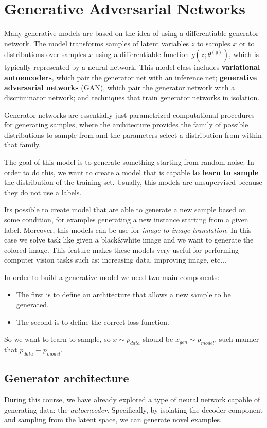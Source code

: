 \chapter{Generative Adversarial Networks}
Many generative models are based on the idea of using a differentiable generator network. The model 
transforms samples of latent variables $z$ to samples $x$ or to distributions over samples $x$ using a 
differentiable function $g(z; \theta^{(g)})$, which is typically represented by a neural network. This 
model class includes \textbf{variational autoencoders}, which pair the generator net with an inference 
net; \textbf{generative adversarial networks} (GAN), which pair the generator network with a discriminator 
network; and techniques that train generator networks in isolation.

Generator networks are essentially just parametrized computational procedures for generating samples, 
where the architecture provides the family of possible distributions to sample from and the parameters 
select a distribution from within that family.

The goal of this model is to generate something starting from random noise. In order to do this, we want 
to create a model that is capable \textbf{to learn to sample} the distribution of the training set. 
Usually, this models are unsupervised because they do not use a labels. 

Its possible to create model that are able to generate a new sample based on some condition, for examples 
generating a new instance starting from a given label. Moreover, this models can be use for \textit{image 
    to image translation}. In this case we solve task like given a black\&white image and we want to 
generate the colored image. This feature makes these models very useful for performing computer vision 
tasks such as: increasing data, improving image, etc$\dots$

In order to build a generative model we need two main components:
\begin{itemize}
    \item The first is to define an architecture that allows a new sample to be generated.
    \item The second is to define the correct loss function. 
\end{itemize}
So we want to learn to sample, so $x \sim p_{data}$ should be $x_{gen}\sim p_{model}$, such manner that $p_{data} \equiv p_{model}$.
\section{Generator architecture}
During this course, we have already explored a type of neural network capable of generating data: the 
\textit{autoencoder}. Specifically, by isolating the decoder component and sampling from the latent space,
we can generate novel examples.

